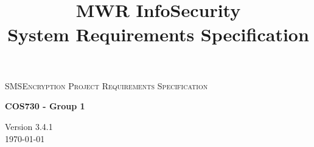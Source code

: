 \begin{titlepage}
\begin{center}

\textsc{\LARGE SMSEncryption Project Requirements Specification}

\textbf{COS730 - Group 1} \\

\title{
  \textbf{\\}
MWR InfoSecurity\\
System Requirements Specification\\
}

\vfill

{\large Version 3.4.1}
\\
{\large \today}

\end{center}
\end{titlepage}
